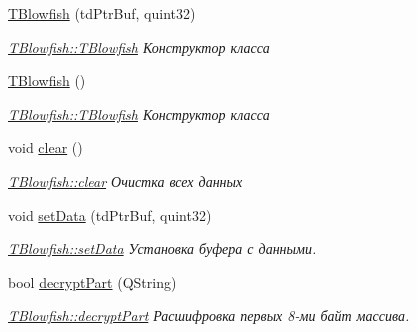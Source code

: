 \begin{DoxyCompactItemize}
\item 
\hyperlink{classblowfish_lib_1_1_t_blowfish_a349e59d7c45d5675376b89def7500c16}{T\+Blowfish} (td\+Ptr\+Buf, quint32)
\begin{DoxyCompactList}\small\item\em \hyperlink{classblowfish_lib_1_1_t_blowfish_a349e59d7c45d5675376b89def7500c16}{T\+Blowfish\+::\+T\+Blowfish} Конструктор класса \end{DoxyCompactList}\item 
\mbox{\label{classblowfish_lib_1_1_t_blowfish_ad9ca35f3391415f31a265c440d63bf7f}} 
\hyperlink{classblowfish_lib_1_1_t_blowfish_ad9ca35f3391415f31a265c440d63bf7f}{T\+Blowfish} ()
\begin{DoxyCompactList}\small\item\em \hyperlink{classblowfish_lib_1_1_t_blowfish_a349e59d7c45d5675376b89def7500c16}{T\+Blowfish\+::\+T\+Blowfish} Конструктор класса \end{DoxyCompactList}\item 
\mbox{\label{classblowfish_lib_1_1_t_blowfish_a2e410b2e410752f3ba96296fbcce9df2}} 
void \hyperlink{classblowfish_lib_1_1_t_blowfish_a2e410b2e410752f3ba96296fbcce9df2}{clear} ()
\begin{DoxyCompactList}\small\item\em \hyperlink{classblowfish_lib_1_1_t_blowfish_a2e410b2e410752f3ba96296fbcce9df2}{T\+Blowfish\+::clear} Очистка всех данных \end{DoxyCompactList}\item 
void \hyperlink{classblowfish_lib_1_1_t_blowfish_aac58cd909cef267ba409859c279dc521}{set\+Data} (td\+Ptr\+Buf, quint32)
\begin{DoxyCompactList}\small\item\em \hyperlink{classblowfish_lib_1_1_t_blowfish_aac58cd909cef267ba409859c279dc521}{T\+Blowfish\+::set\+Data} Установка буфера с данными. \end{DoxyCompactList}\item 
bool \hyperlink{classblowfish_lib_1_1_t_blowfish_a5bb77f2618aa5dd97b86d842e546fdae}{decrypt\+Part} (Q\+String)
\begin{DoxyCompactList}\small\item\em \hyperlink{classblowfish_lib_1_1_t_blowfish_a5bb77f2618aa5dd97b86d842e546fdae}{T\+Blowfish\+::decrypt\+Part} Расшифровка первых 8-\/ми байт массива. \end{DoxyCompactList}\item 

\end{DoxyCompactItemize}
